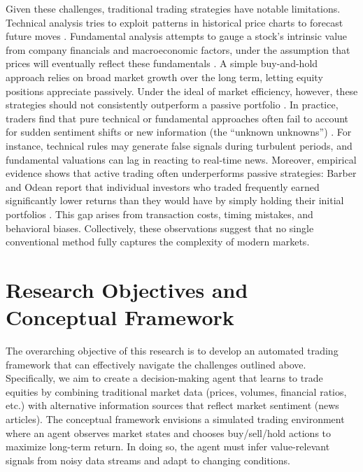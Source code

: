 Given these challenges, traditional trading strategies have notable limitations. Technical analysis tries to exploit patterns in historical price charts to forecast future moves \cite{Murphy1999}. Fundamental analysis attempts to gauge a stock's intrinsic value from company financials and macroeconomic factors, under the assumption that prices will eventually reflect these fundamentals \cite{Penman2013}. A simple buy-and-hold approach relies on broad market growth over the long term, letting equity positions appreciate passively. Under the ideal of market efficiency, however, these strategies should not consistently outperform a passive portfolio \cite{Malkiel2003}. In practice, traders find that pure technical or fundamental approaches often fail to account for sudden sentiment shifts or new information (the “unknown unknowns”) \cite{Taleb2007}. For instance, technical rules may generate false signals during turbulent periods, and fundamental valuations can lag in reacting to real-time news. Moreover, empirical evidence shows that active trading often underperforms passive strategies: Barber and Odean report that individual investors who traded frequently earned significantly lower returns than they would have by simply holding their initial portfolios \cite{Barber2000}. This gap arises from transaction costs, timing mistakes, and behavioral biases. Collectively, these observations suggest that no single conventional method fully captures the complexity of modern markets.

\section{Research Objectives and Conceptual Framework}
\label{sec:objectives}
The overarching objective of this research is to develop an automated trading framework that can effectively navigate the challenges outlined above. Specifically, we aim to create a decision-making agent that learns to trade equities by combining traditional market data (prices, volumes, financial ratios, etc.) with alternative information sources that reflect market sentiment (news articles). The conceptual framework envisions a simulated trading environment where an agent observes market states and chooses buy/sell/hold actions to maximize long-term return. In doing so, the agent must infer value-relevant signals from noisy data streams and adapt to changing conditions.

